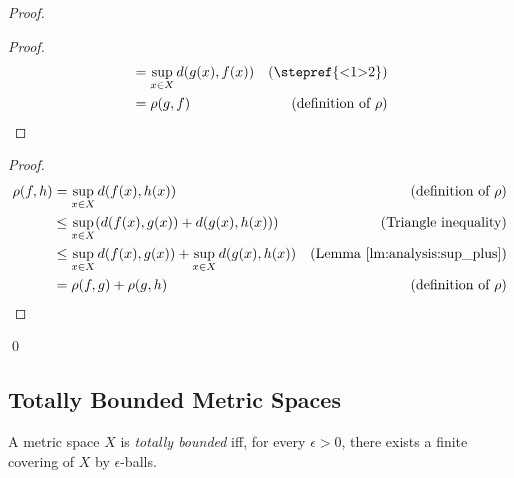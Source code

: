 \begin{proof}
\begin{proof}
\begin{align*}
      & = \sup_{x \in X} d(g(x), f(x)) & (\text{\stepref{<1>2}}) \\
      & = \rho(g, f) & (\text{definition of } \rho)
    \end{align*}
  \end{proof}
  \begin{proof}
    \pf
    \begin{align*}
      \rho(f,h) & = \sup_{x \in X} d(f(x), h(x)) & (\text{definition of } \rho) \\
      & \leq \sup_{x \in X} (d(f(x), g(x)) + d(g(x), h(x))) &
      (\text{Triangle inequality})\\
      & \leq \sup_{x \in X} d(f(x), g(x)) + \sup_{x \in X} d(g(x), h(x)) & (\text{Lemma \ref{lm:analysis:sup_plus}}) \\
      & = \rho(f,g) + \rho(g,h) & (\text{definition of } \rho)
    \end{align*}
  \end{proof}
  \qed
\end{proof}

\subsection{Totally Bounded Metric Spaces}

\begin{df}
  A metric space $X$ is \emph{totally bounded} iff, for every $\epsilon > 0$, there exists a finite covering of $X$ by $\epsilon$-balls.
\end{df}
